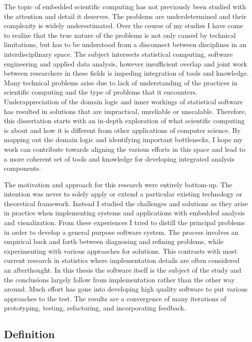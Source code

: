 The topic of embedded scientific computing has not previously been studied with the attention and detail it deserves. The problems are underdetermined and their complexity is widely underestimated. Over the course of my studies I have come to realize that the true nature of the problems is not only caused by technical limitations, but has to be understood from a disconnect between disciplines in an interdisciplinary space. The subject intersects statistical computing, software engineering and applied data analysis, however insufficient overlap and joint work between researchers in these fields is impeding integration of tools and knowledge. Many technical problems arise due to lack of understanding of the practices in scientific computing and the type of problems that it encounters. Underappreciation of the domain logic and inner workings of statistical software has resulted in solutions that are impractical, unreliable or unscalable. Therefore, this dissertation starts with an in-depth exploration of what scientific computing is about and how it is different from other applications of computer science. By mapping out the domain logic and identifying important bottlenecks, I hope my work can contribute towards aligning the various efforts in this space and lead to a more coherent set of tools and knowledge for developing integrated analysis components. 

The motivation and approach for this research were entirely bottom-up. The intention was never to solely apply or extend a particular existing technology or theoretical framework. Instead I studied the challenges and solutions as they arise in practice when implementing systems and applications with embedded analysis and visualization. From these experiences I tried to distill the principal problems in order to develop a general purpose software system. The process involves an empirical back and forth between diagnosing and refining problems, while experimenting with various approaches for solutions. This contrasts with most current research in statistics where implementation details are often considered an afterthought. In this thesis the software itself is the subject of the study and the conclusions largely follow from implementation rather than the other way around. Much effort has gone into developing high quality software to put various approaches to the test. The results are a convergence of many iterations of prototyping, testing, refactoring, and incorporating feedback. 


\subsection{Definition}

